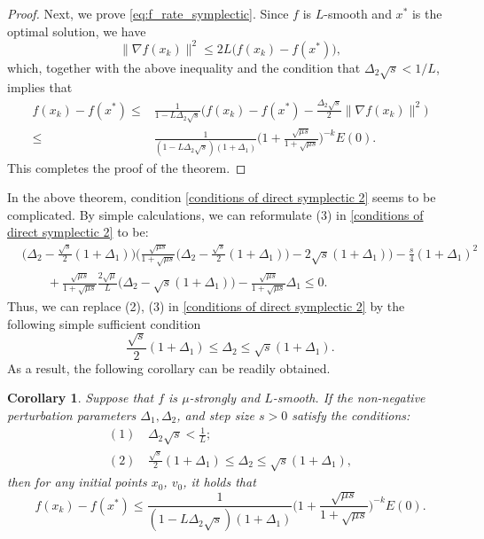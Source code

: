 \documentclass[11pt]{article}
\newcommand{\1}{\mathbf 1}
\numberwithin{equation}{section}
\newtheorem{CO}{Corollary}
\begin{document}
\begin{proof}
{Next, we prove \eqref{eq:f_rate_symplectic}. Since $f$ is $L$-smooth and $x^*$ is the optimal solution, we have
\begin{equation*}
    \|\nabla f(x_{k})\|^2 \leqslant 2L \big(f(x_k)-f(x^*)\big),
\end{equation*}
which, together with the above inequality and the condition that $\Delta_2\sqrt{s}< 1/L$, implies that
\begin{align*}
    f(x_k)-f(x^*) \leqslant & \frac{1}{1-L\Delta_2\sqrt{s}}\big(f(x_k)-f(x^*)-\frac{\Delta_2\sqrt{s}}{2}\|\nabla f(x_k)\|^2 \big)\\ \leqslant & \frac{1}{(1-L\Delta_2\sqrt{s})(1+\Delta_1)}\Big(1+\frac{\sqrt{\mu s}}{1+\sqrt{\mu s}}\Big)^{-k}E(0).
\end{align*}
}
This completes the proof of the theorem.
\end{proof}

In the above theorem, condition \eqref{conditions of direct symplectic 2} seems to be complicated. By simple calculations, we can reformulate (3) in \eqref{conditions of direct symplectic 2} to be:
\begin{equation*}
    \begin{aligned}
        &\big(\Delta_2-\frac{\sqrt{s}}{2}(1+\Delta_1)\big)\big(\frac{\sqrt{\mu s}}{1+\sqrt{\mu s}}\big(\Delta_2-\frac{\sqrt{s}}{2}(1+\Delta_1)\big)-2\sqrt{s}(1+\Delta_1)\big)-\frac{s}{4}(1+\Delta_1)^2\\
        &\qquad +\frac{\sqrt{\mu s}}{1+\sqrt{\mu s}}\frac{2\sqrt{\mu}}{L}\big(\Delta_2-\sqrt{s}(1+\Delta_1)\big)-\frac{\sqrt{\mu s}}{1+\sqrt{\mu s}}\Delta_1 \leqslant 0.
    \end{aligned}
\end{equation*}
Thus, we can replace (2), (3) in \eqref{conditions of direct symplectic 2} by the following simple sufficient condition
$$\frac{\sqrt{s}}{2}(1+\Delta_1)\leqslant \Delta_2 \leqslant \sqrt{s}(1+\Delta_1).$$
As a result, the following corollary can be readily obtained.
\begin{CO}
    \label{symplectic 2 sufficient condition}
     Suppose that $f$ is $\mu$-strongly and $L$-smooth. If the non-negative perturbation parameters $\Delta_1, \Delta_2$, and step size $s>0$ satisfy the conditions:
\begin{equation}
    \label{conditions for symplectic 2 sufficient}
    \begin{aligned}
        (1)& \,  \Delta_2\sqrt{s}< \frac{1}{L};\\
        (2)& \, \frac{\sqrt{s}}{2}(1+\Delta_1)\leqslant \Delta_2 \leqslant \sqrt{s}(1+\Delta_1),
    \end{aligned}
\end{equation}
then for any initial points $x_0$, $v_0$, it holds that 
\begin{equation}
	\label{eq:ratecorollary}
	f(x_k)-f(x^*)\leqslant \frac{1}{(1-L\Delta_2\sqrt{s})(1+\Delta_1)}\Big(1+\frac{\sqrt{\mu s}}{1+\sqrt{\mu s}}\Big)^{-k}E(0).
\end{equation}
\end{CO}
\end{document}
